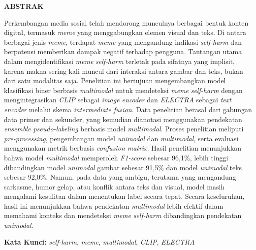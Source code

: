 \clearpage
{}%
\thispagestyle{fancy}

\begin{center}
	\large \bfseries \MakeUppercase{Abstrak}\\
	\bigskip
	
	\normalsize \normalfont \justifying \singlespacing
	Perkembangan media sosial telah mendorong munculnya berbagai bentuk konten digital, termasuk \textit{meme} yang menggabungkan elemen visual dan teks. Di antara berbagai jenis \textit{meme}, terdapat \textit{meme} yang mengandung indikasi \textit{self-harm} dan berpotensi memberikan dampak negatif terhadap pengguna. Tantangan utama dalam mengidentifikasi \textit{meme} \textit{self-harm} terletak pada sifatnya yang implisit, karena makna sering kali muncul dari interaksi antara gambar dan teks, bukan dari satu modalitas saja. Penelitian ini bertujuan mengembangkan model klasifikasi biner berbasis \textit{multimodal} untuk mendeteksi \textit{meme} \textit{self-harm} dengan mengintegrasikan \textit{CLIP} sebagai \textit{image encoder} dan \textit{ELECTRA} sebagai \textit{text encoder} melalui skema \textit{intermediate fusion}. Data penelitian berasal dari gabungan data primer dan sekunder, yang kemudian dianotasi menggunakan pendekatan \textit{ensemble pseudo-labeling} berbasis model \textit{multimodal}. Proses penelitian meliputi \textit{pre-processing}, pengembangan model \textit{unimodal} dan \textit{multimodal}, serta evaluasi menggunakan metrik berbasis \textit{confusion matrix}. Hasil penelitian menunjukkan bahwa model \textit{multimodal} memperoleh \textit{F1-score} sebesar 96,1\%, lebih tinggi dibandingkan model \textit{unimodal} gambar sebesar 91,5\% dan model \textit{unimodal} teks sebesar 92,0\%. Namun, pada data yang ambigu, terutama yang mengandung sarkasme, humor gelap, atau konflik antara teks dan visual, model masih mengalami kesulitan dalam menentukan label secara tepat. Secara keseluruhan, hasil ini menunjukkan bahwa pendekatan \textit{multimodal} lebih efektif dalam memahami konteks dan mendeteksi \textit{meme} \textit{self-harm} dibandingkan pendekatan \textit{unimodal}.\par

    \vspace{20pt}
	\raggedright \textbf{Kata Kunci:} \textit{self-harm}, \textit{meme}, \textit{multimodal}, \textit{CLIP}, \textit{ELECTRA}
	
	\vfill
	
\end{center}
\clearpage